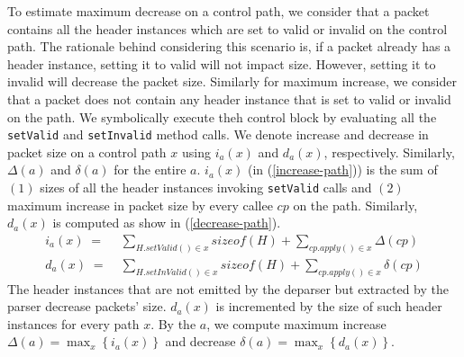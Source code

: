 \documentclass[letterpaper,twocolumn,10pt]{article}
\begin{document}
To estimate maximum decrease on a control path, we consider that a 
packet contains all the header instances which are set to valid or 
invalid on the control path. The rationale behind considering this 
scenario is, if a packet already has a header instance, setting it to 
valid will not impact size. However, setting it to invalid will 
decrease the packet size.
Similarly for maximum increase, we consider that a packet does not 
contain any header instance that is set to valid or invalid on the 
path. We symbolically execute theh control block by evaluating all 
the  \texttt{setValid} and \texttt{setInvalid} method calls.
We denote increase and decrease in packet size on a control path $x$ 
using $i_{a}(x)$ and $d_{a}(x)$, respectively. Similarly, $\Delta(a)$ 
and $\delta(a)$ for the entire \uprogram $a$. $i_{a}(x)$ (in 
(\ref{increase-path})) is the sum of $(1)$ sizes of all the header 
instances invoking \texttt{setValid} calls and $(2)$ maximum increase 
in packet size by every callee \uprogram $cp$ on the path.
Similarly, $d_{a}(x)$ is computed as show in (\ref{decrease-path}).
\begin{align}
i_{a}(x)\; =& \; \sum_{H.setValid() \in x} sizeof(H) + \sum_{cp.apply()\in x} \Delta(cp) \label{increase-path} \\
d_{a}(x)\; =& \; \sum_{H.setInValid() \in x} sizeof(H) + \sum_{cp.apply()\in x} \delta(cp) \label{decrease-path}
\end{align}
The header instances that are not emitted by the deparser but 
extracted by the parser decrease packets' size. $d_{a}(x)$ is 
incremented by the size of such header instances for every path $x$.
By the \uprogram $a$, we compute maximum increase $\Delta(a) = 
\max_{x} \left\{ i_{a}(x) \right\} $ and decrease $\delta(a) = 
\max_{x} \left\{ d_{a}(x) \right\}$.

\end{document}

